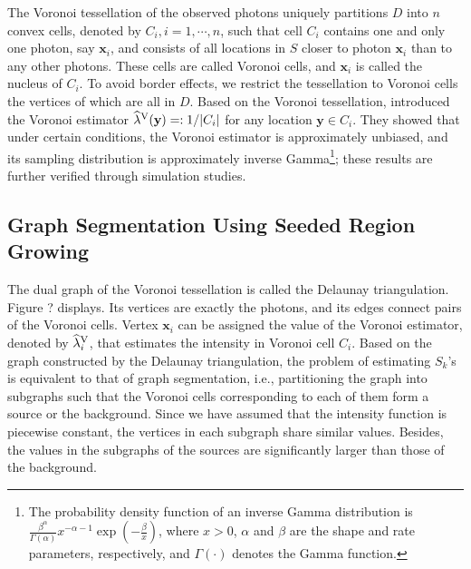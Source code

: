 \documentclass{aastex61}
\begin{document}
The Voronoi tessellation of the observed photons uniquely partitions $D$ into $n$ convex cells, denoted by $C_i, i=1, \cdots, n$, such that cell $C_i$ contains one and only one photon, say $\mathbf{x}_i$, and consists of all locations in $S$ closer to photon $\mathbf{x}_i$ than to any other photons. These cells are called Voronoi cells, and $\mathbf{x}_i$ is called the nucleus of $C_i$. To avoid border effects, we restrict the tessellation to Voronoi cells the vertices of which are all in $D$. Based on the Voronoi tessellation, \citet{Barr-10} introduced the Voronoi estimator $\widehat{\lambda}^{\rm V}(\mathbf{y})=:1/|C_i|$ for any location $\mathbf{y} \in C_i$. They showed that under certain conditions, the Voronoi estimator is approximately unbiased, and its sampling distribution is approximately inverse Gamma\footnote{The probability density function of an inverse Gamma
distribution is $\frac{\beta^{\alpha}}{\Gamma(\alpha)}x^{-\alpha-1}\exp \left( -\frac{\beta}{x} \right)$, where $x>0$, $\alpha$ and $\beta$ are the shape and rate parameters, respectively, and $\Gamma(\cdot)$ denotes the Gamma function.}; these results are further verified through simulation studies.

\subsection{Graph Segmentation Using Seeded Region Growing}
The dual graph of the Voronoi tessellation is called the Delaunay triangulation. Figure ? displays. Its vertices are exactly the photons, and its edges connect pairs of the Voronoi cells. 
Vertex $\mathbf{x}_i$ can be assigned the value of the Voronoi estimator, denoted by $\widehat{\lambda}_i^{\rm V}$, that estimates the intensity in Voronoi cell $C_i$. Based on the graph constructed by the Delaunay triangulation, 
the problem of estimating $S_k$'s is equivalent to that of graph segmentation, i.e., partitioning the graph into subgraphs such that the Voronoi cells corresponding to each of them form a source or the background. Since
we have assumed that the intensity function is piecewise constant, the vertices in each subgraph share similar values. Besides, the values in the subgraphs of the sources are significantly larger than those of the background.
\end{document}
